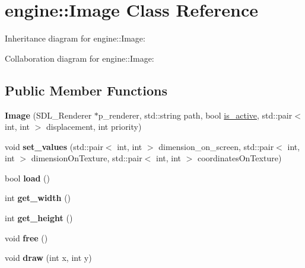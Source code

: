 \hypertarget{classengine_1_1_image}{}\section{engine\+:\+:Image Class Reference}
\label{classengine_1_1_image}


Inheritance diagram for engine\+:\+:Image\+:


Collaboration diagram for engine\+:\+:Image\+:
\subsection*{Public Member Functions}
\begin{DoxyCompactItemize}
\item 
{\bfseries Image} (S\+D\+L\+\_\+\+Renderer $\ast$p\+\_\+renderer, std\+::string path, bool \hyperlink{classengine_1_1_component_ae1a97027b9862ee3e41e6566501d765e}{is\+\_\+active}, std\+::pair$<$ int, int $>$ displacement, int priority)\hypertarget{classengine_1_1_image_aa3429cf7f78e43a8c28a536f6849716c}{}\label{classengine_1_1_image_aa3429cf7f78e43a8c28a536f6849716c}

\item 
void {\bfseries set\+\_\+values} (std\+::pair$<$ int, int $>$ dimension\+\_\+on\+\_\+screen, std\+::pair$<$ int, int $>$ dimension\+On\+Texture, std\+::pair$<$ int, int $>$ coordinates\+On\+Texture)\hypertarget{classengine_1_1_image_aa0ed04e99b416fb5780f0c7ceb99f843}{}\label{classengine_1_1_image_aa0ed04e99b416fb5780f0c7ceb99f843}

\item 
bool {\bfseries load} ()\hypertarget{classengine_1_1_image_a1a393960f7402515428bd982c32f59af}{}\label{classengine_1_1_image_a1a393960f7402515428bd982c32f59af}

\item 
int {\bfseries get\+\_\+width} ()\hypertarget{classengine_1_1_image_a4eeafefc0bae9658ffe8877c5cf681e7}{}\label{classengine_1_1_image_a4eeafefc0bae9658ffe8877c5cf681e7}

\item 
int {\bfseries get\+\_\+height} ()\hypertarget{classengine_1_1_image_a5082f1fdc63e6bb76a105348e72e2e02}{}\label{classengine_1_1_image_a5082f1fdc63e6bb76a105348e72e2e02}

\item 
void {\bfseries free} ()\hypertarget{classengine_1_1_image_aa70272a861bcaa5297e6967c9106197f}{}\label{classengine_1_1_image_aa70272a861bcaa5297e6967c9106197f}

\item 
void {\bfseries draw} (int x, int y)\hypertarget{classengine_1_1_image_a45ce17ceb8619e732f2d09ec6d1cc1b9}{}\label{classengine_1_1_image_a45ce17ceb8619e732f2d09ec6d1cc1b9}

\end{DoxyCompactItemize}
